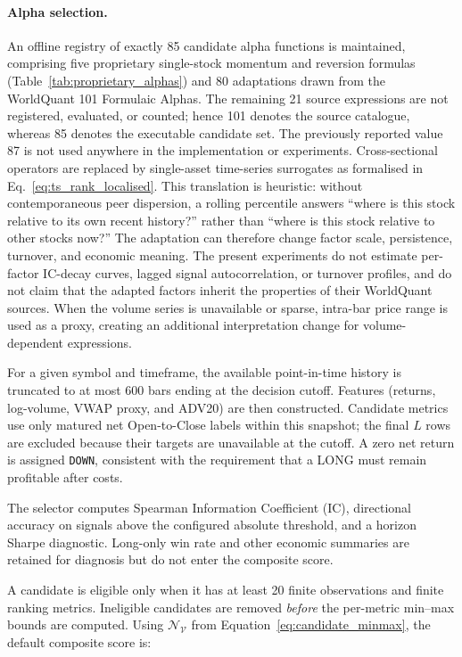 \paragraph{Alpha selection.}
An offline registry of exactly 85 candidate alpha functions is maintained, comprising five proprietary single-stock momentum and reversion formulas (Table~\ref{tab:proprietary_alphas}) and 80 adaptations drawn from the WorldQuant 101 Formulaic Alphas. The remaining 21 source expressions are not registered, evaluated, or counted; hence 101 denotes the source catalogue, whereas 85 denotes the executable candidate set. The previously reported value 87 is not used anywhere in the implementation or experiments. Cross-sectional operators are replaced by single-asset time-series surrogates as formalised in Eq.~\eqref{eq:ts_rank_localised}. This translation is heuristic: without contemporaneous peer dispersion, a rolling percentile answers ``where is this stock relative to its own recent history?'' rather than ``where is this stock relative to other stocks now?'' The adaptation can therefore change factor scale, persistence, turnover, and economic meaning. The present experiments do not estimate per-factor IC-decay curves, lagged signal autocorrelation, or turnover profiles, and do not claim that the adapted factors inherit the properties of their WorldQuant sources. When the volume series is unavailable or sparse, intra-bar price range is used as a proxy, creating an additional interpretation change for volume-dependent expressions.

For a given symbol and timeframe, the available point-in-time history is truncated to at most 600 bars ending at the decision cutoff. Features (returns, log-volume, VWAP proxy, and ADV20) are then constructed. Candidate metrics use only matured net Open-to-Close labels within this snapshot; the final $L$ rows are excluded because their targets are unavailable at the cutoff. A zero net return is assigned \texttt{DOWN}, consistent with the requirement that a LONG must remain profitable after costs.

The selector computes Spearman Information Coefficient (IC), directional accuracy on signals above the configured absolute threshold, and a horizon Sharpe diagnostic. Long-only win rate and other economic summaries are retained for diagnosis but do not enter the composite score.

A candidate is eligible only when it has at least 20 finite observations and finite ranking metrics. Ineligible candidates are removed \emph{before} the per-metric min--max bounds are computed. Using $\mathcal{N}_{\mathcal{V}}$ from Equation~\eqref{eq:candidate_minmax}, the default composite score is:


